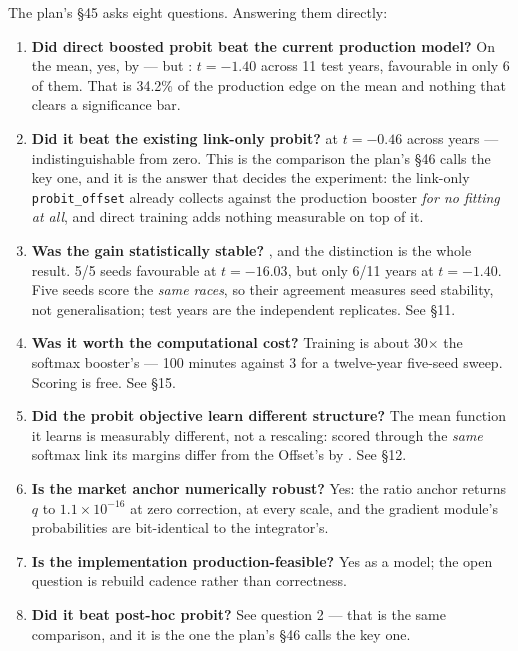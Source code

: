 The plan's §45 asks eight questions. Answering them directly:

\begin{enumerate}[leftmargin=1.5em]\itemsep3pt
\item \textbf{Did direct boosted probit beat the current production model?} On the mean, yes, by  --- but : $t=-1.40$ across 11 test years, favourable in only 6 of them. That is 34.2\% of the production edge on the mean and nothing that clears a significance bar.
\item \textbf{Did it beat the existing link-only probit?}   at $t=-0.46$ across years --- indistinguishable from zero. This is the comparison the plan's §46 calls the key one, and it is the answer that decides the experiment: the link-only \texttt{probit\_offset} already collects  against the production booster \emph{for no fitting at all}, and direct training adds nothing measurable on top of it.
\item \textbf{Was the gain statistically stable?} , and the distinction is the whole result. 5/5 seeds favourable at $t=-16.03$, but only 6/11 years at $t=-1.40$. Five seeds score the \emph{same races}, so their agreement measures seed stability, not generalisation; test years are the independent replicates. See §11.
\item \textbf{Was it worth the computational cost?} Training is about 30$\times$ the softmax booster's --- 100 minutes against 3 for a twelve-year five-seed sweep. Scoring is free. See §15.
\item \textbf{Did the probit objective learn different structure?} The mean function it learns is measurably different, not a rescaling: scored through the \emph{same} softmax link its margins differ from the Offset's by . See §12.
\item \textbf{Is the market anchor numerically robust?} Yes: the ratio anchor returns $q$ to $1.1\times10^{-16}$ at zero correction, at every scale, and the gradient module's probabilities are bit-identical to the integrator's.
\item \textbf{Is the implementation production-feasible?} Yes as a model; the open question is rebuild cadence rather than correctness.
\item \textbf{Did it beat post-hoc probit?} See question 2 --- that is the same comparison, and it is the one the plan's §46 calls the key one.
\end{enumerate}

